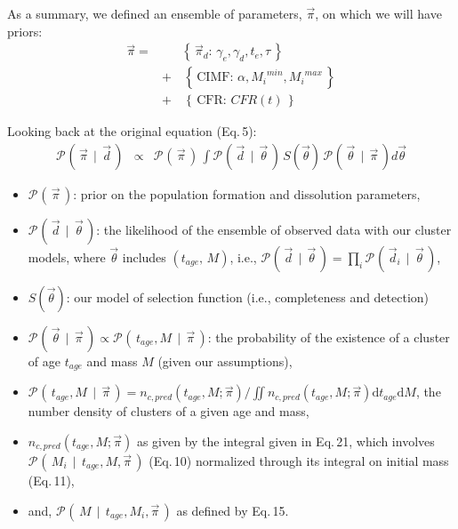 \documentclass[a4paper]{article}
\newcommand{\given}{\ensuremath{\,\mid\,}}
\newcommand{\proba}[2][]{\ensuremath{\mathcal{P}_{#1}\left(\, #2 \,\right)}}
\newcommand{\set}[1]{\ensuremath{\left\{\,#1\,\right\}}}
\newcommand{\data}{\ensuremath{\overrightarrow{d}}}
\newcommand{\nclpred}{\ensuremath{n_{c,pred}}}
\newcommand{\tage}{\ensuremath{t_{age}}}
\newcommand{\Mi}{\ensuremath{M_{i}}}
\newcommand{\PI}{\ensuremath{\overrightarrow{\pi}}} %
\newcommand{\T}{\ensuremath{\overrightarrow{\theta}}} %
\newcommand{\dif}{\ensuremath{\text{d}}} %
\begin{document}
\medskip

As a summary, we defined an ensemble of parameters, $\PI$, on which we will have priors:
\begin{eqnarray}
\PI =& & \set{ \PI_d:\, \gamma_e, \gamma_d, t_e, \tau}\,\nonumber \\
     &+& \,\set{\text{CIMF}:\,\alpha,\Mi^{min}, \Mi^{max}}\nonumber\\
     &+& \,\set{\text{CFR}:\,CFR(t)}
\end{eqnarray}

Looking back at the original equation (Eq.\,5):
\begin{eqnarray}
\proba{\PI \given \data} & \propto & \proba{\PI}\,\int{\proba{\data \given \T}\,S(\T)\,\proba{\T\given \PI }d\T}
\end{eqnarray}
\begin{itemize}
\item $\proba{\PI}$: prior on the population formation and dissolution parameters,
\item $\proba{\data \given \T}$: the likelihood of the ensemble of observed data with our cluster models, where $\T$ includes $(\tage,\,M)$, i.e., $\proba{\data \given \T} = \prod_i \proba{\data_i\given\T}$,
\item $S(\T)$: our model of selection function (i.e., completeness and detection)
\item $\proba{\T\given \PI }\propto\proba{\tage, M\given \PI }$: the probability of the existence of a cluster of age $\tage$ and mass $M$ (given our assumptions),
\item $\proba{\tage, M\given \PI } = \nclpred(\tage, M; \PI) / \iint \nclpred(\tage, M; \PI)\dif\tage\dif M $, the number density of clusters of a given age and mass,
\item $\nclpred(\tage, M; \PI)$ as given by the integral given in Eq.\,21, which involves $\proba{\Mi\given\tage,M,\PI}$ (Eq.\,10) normalized through its integral on initial mass (Eq.\,11),
\item and, $\proba{M \given \tage,\Mi,\PI}$ as defined by Eq.\,15. 
\end{itemize}
\end{document}
